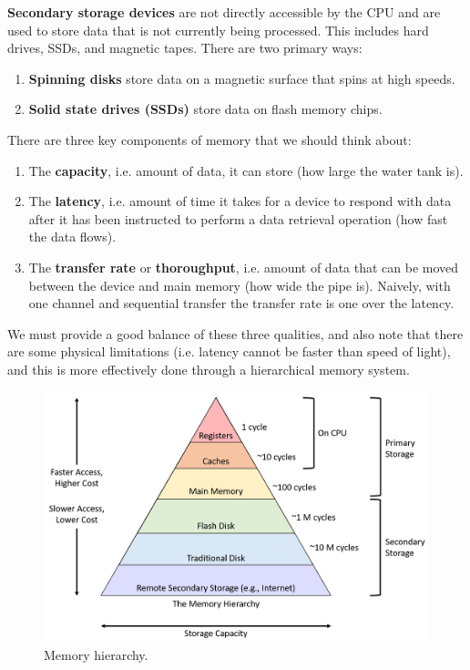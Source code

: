   \begin{definition}
    \textbf{Secondary storage devices} are not directly accessible by the CPU and are used to store data that is not currently being processed. This includes hard drives, SSDs, and magnetic tapes. There are two primary ways: 
    \begin{enumerate}
      \item \textbf{Spinning disks} store data on a magnetic surface that spins at high speeds.
      \item \textbf{Solid state drives (SSDs)} store data on flash memory chips.
    \end{enumerate}
  \end{definition}

  There are three key components of memory that we should think about: 
  \begin{enumerate}
    \item The \textbf{capacity}, i.e. amount of data, it can store (how large the water tank is). 
    \item The \textbf{latency}, i.e. amount of time it takes for a device to respond with data after it has been instructed to perform a data retrieval operation (how fast the data flows). 
    \item The \textbf{transfer rate} or \textbf{thoroughput}, i.e. amount of data that can be moved between the device and main memory (how wide the pipe is). Naively, with one channel and sequential transfer the transfer rate is one over the latency. 
  \end{enumerate}

  We must provide a good balance of these three qualities, and also note that there are some physical limitations (i.e. latency cannot be faster than speed of light), and this is more effectively done through a hierarchical memory system.

  \begin{figure}[H]
    \centering 
    \includegraphics[scale=0.4]{img/memory_hierarchy.png}
    \caption{Memory hierarchy.} 
    \label{fig:memory_hierarchy}
  \end{figure}

